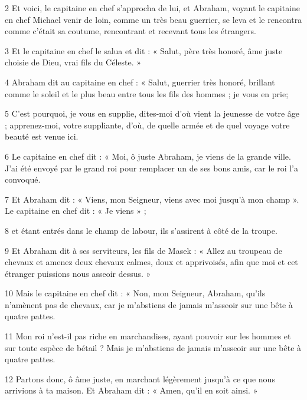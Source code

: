 \par 2 Et voici, le capitaine en chef s'approcha de lui, et Abraham, voyant le capitaine en chef Michael venir de loin, comme un très beau guerrier, se leva et le rencontra comme c'était sa coutume, rencontrant et recevant tous les étrangers.

\par 3 Et le capitaine en chef le salua et dit : « Salut, père très honoré, âme juste choisie de Dieu, vrai fils du Céleste. »

\par 4 Abraham dit au capitaine en chef : « Salut, guerrier très honoré, brillant comme le soleil et le plus beau entre tous les fils des hommes ; je vous en prie;

\par 5 C'est pourquoi, je vous en supplie, dites-moi d'où vient la jeunesse de votre âge ; apprenez-moi, votre suppliante, d'où, de quelle armée et de quel voyage votre beauté est venue ici.

\par 6 Le capitaine en chef dit : « Moi, ô juste Abraham, je viens de la grande ville. J'ai été envoyé par le grand roi pour remplacer un de ses bons amis, car le roi l'a convoqué.

\par 7 Et Abraham dit : « Viens, mon Seigneur, viens avec moi jusqu'à mon champ ». Le capitaine en chef dit : « Je viens » ;

\par 8 et étant entrés dans le champ de labour, ils s'assirent à côté de la troupe.

\par 9 Et Abraham dit à ses serviteurs, les fils de Masek : « Allez au troupeau de chevaux et amenez deux chevaux calmes, doux et apprivoisés, afin que moi et cet étranger puissions nous asseoir dessus. »

\par 10 Mais le capitaine en chef dit : « Non, mon Seigneur, Abraham, qu'ils n'amènent pas de chevaux, car je m'abstiens de jamais m'asseoir sur une bête à quatre pattes.

\par 11 Mon roi n'est-il pas riche en marchandises, ayant pouvoir sur les hommes et sur toute espèce de bétail ? Mais je m'abstiens de jamais m'asseoir sur une bête à quatre pattes.

\par 12 Partons donc, ô âme juste, en marchant légèrement jusqu'à ce que nous arrivions à ta maison. Et Abraham dit : « Amen, qu’il en soit ainsi. »


